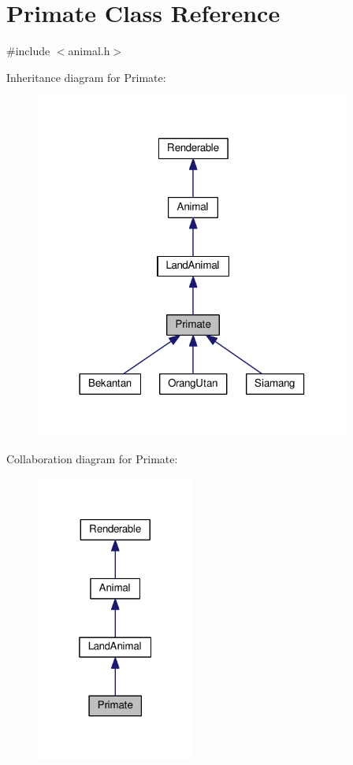 \hypertarget{classPrimate}{}\section{Primate Class Reference}
\label{classPrimate}


{\ttfamily \#include $<$animal.\+h$>$}



Inheritance diagram for Primate\+:
\nopagebreak
\begin{figure}[H]
\begin{center}
\leavevmode
\includegraphics[width=294pt]{classPrimate__inherit__graph}
\end{center}
\end{figure}


Collaboration diagram for Primate\+:
\nopagebreak
\begin{figure}[H]
\begin{center}
\leavevmode
\includegraphics[width=148pt]{classPrimate__coll__graph}
\end{center}
\end{figure}
